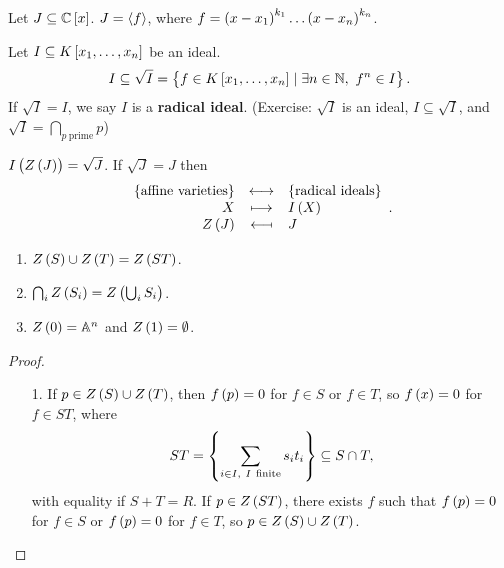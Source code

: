 \pagebreak

\begin{example}
Let $ J \subseteq \C\sbr{x} $. $ J = \left\langle f \right\rangle $, where $ f = \br{x - x_1}^{k_1} \dots \br{x - x_n}^{k_n} $.
\end{example}

\begin{definition}
Let $ I \subseteq K\sbr{x_1, \dots, x_n} $ be an ideal.
$$ I \subseteq \sqrt{I} = \cbr{f \in K\sbr{x_1, \dots, x_n} \mid \exists n \in \N, \ f^n \in I}. $$
If $ \sqrt{I} = I $, we say $ I $ is a \textbf{radical ideal}. (Exercise: $ \sqrt{I} $ is an ideal, $ I \subseteq \sqrt{I} $, and $ \sqrt{I} = \bigcap_{p \ \text{prime}} p $)
\end{definition}

\begin{theorem}
$ I\br{Z\br{J}} = \sqrt{J} $. If $ \sqrt{J} = J $ then
$$
\begin{array}{rcl}
\cbr{\text{affine varieties}} & \longleftrightarrow & \cbr{\text{radical ideals}} \\
X & \longmapsto & I\br{X} \\
Z\br{J} & \longmapsfrom & J
\end{array}.
$$
\end{theorem}


\begin{proposition}
\hfill
\begin{enumerate}
\item $ Z\br{S} \cup Z\br{T} = Z\br{ST} $.
\item $ \bigcap_i Z\br{S_i} = Z\br{\bigcup_i S_i} $.
\item $ Z\br{0} = \A^n $ and $ Z\br{1} = \emptyset $.
\end{enumerate}
\end{proposition}

\begin{proof}
\hfill
\begin{itemize}
\item[1.] If $ p \in Z\br{S} \cup Z\br{T} $, then $ f\br{p} = 0 $ for $ f \in S $ or $ f \in T $, so $ f\br{x} = 0 $ for $ f \in ST $, where
$$ ST = \cbr{\sum_{i \in I, \ I \ \text{finite}} s_it_i} \subseteq S \cap T, $$
with equality if $ S + T = R $. If $ p \in Z\br{ST} $, there exists $ f $ such that $ f\br{p} = 0 $ for $ f \in S $ or $ f\br{p} = 0 $ for $ f \in T $, so $ p \in Z\br{S} \cup Z\br{T} $.
\end{itemize}
\end{proof}

